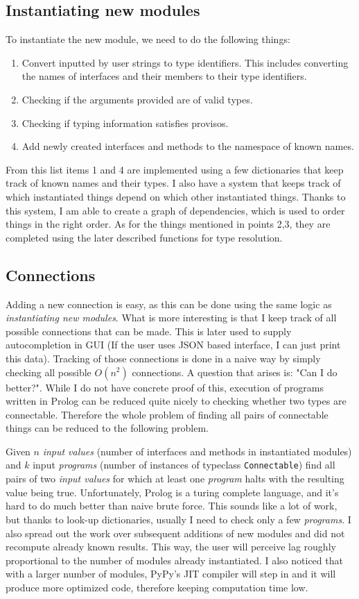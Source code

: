 \documentclass[12pt]{report}
\begin{document}
\subsection{Instantiating new modules} 
To instantiate the new module, we need to do the following things: 
\begin{enumerate} 
   \item Convert inputted by user strings to type identifiers. This includes converting the names of interfaces and their members to their type identifiers. 
   \item Checking if the arguments provided are of valid types. 
   \item Checking if typing information satisfies provisos. 
   \item Add newly created interfaces and methods to the namespace of known names. 
\end{enumerate} 
From this list items 1 and 4 are implemented using a few dictionaries that keep track of known names and their types. I also have a system that keeps track of which instantiated things depend on which other instantiated things. Thanks to this system, I am able to create a graph of dependencies, which is used to order things in the right order. As for the things mentioned in points 2,3, they are completed using the later described functions for type resolution. 
\subsection{Connections}
Adding a new connection is easy, as this can be done using the same logic as \emph{instantiating new modules}. What is more interesting is that I keep track of all possible connections that can be made. This is later used to supply autocompletion in GUI (If the user uses JSON based interface, I can just print this data). Tracking of those connections is done in a naive way by simply checking all possible $O(n^2)$ connections. A question that arises is: "Can I do better?". While I do not have concrete proof of this, execution of programs written in Prolog can be reduced quite nicely to checking whether two types are connectable. Therefore the whole problem of finding all pairs of connectable things can be reduced to the following problem.
\par
Given $n$ \emph{input values} (number of interfaces and methods in instantiated modules) and $k$ input \emph{programs} (number of instances of typeclass \verb!Connectable!) find all pairs of two \emph{input values} for which at least one \emph{program} halts with the resulting value being true.
Unfortunately, Prolog is a turing complete language, and it's hard to do much better than naive brute force.
This sounds like a lot of work, but thanks to look-up dictionaries, usually I need to check only a few \emph{programs}. I also spread out the work over subsequent additions of new modules and did not recompute already known results. This way, the user will perceive lag roughly proportional to the number of modules already instantiated. I also noticed that with a larger number of modules, PyPy's JIT compiler will step in and it will produce more optimized code, therefore keeping computation time low. 
 
\end{document}
